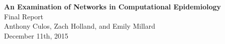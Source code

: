 \begin{titlepage}
\begin{center}
\vspace*{150px}
\LARGE{\textbf{An Examination of Networks in Computational Epidemiology} \\}
\vspace{12px}
\Large{Final Report\\}
\vspace{12px}
\large{Anthony Culos, Zach Holland, and Emily Millard \\}
\vspace{12px}
\large{December 11th, 2015 \\}
\end{center}
\end{titlepage}